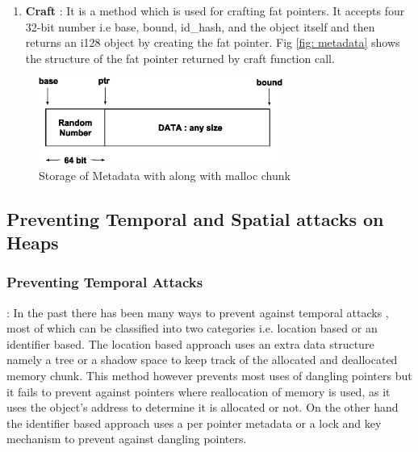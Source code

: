 \begin{enumerate}
    \item \textbf{Craft} : It is a method which is used for crafting fat pointers. It accepts four 32-bit number i.e base, bound, id\_hash, and the object itself and then returns an i128 object by creating the fat pointer. Fig \ref{fig: metadata} shows the structure of the fat pointer returned by craft function call.
\end{enumerate}

\begin{figure}
\centering
\captionsetup{justification=centering}
\includegraphics[width=8cm]{malloc.eps}
\caption{Storage of Metadata with along with malloc chunk}
\label{fig:malloc_chuck}
\hrulefill
\end{figure}

\subsection{Preventing Temporal and Spatial attacks on Heaps}

\subsubsection{Preventing Temporal Attacks} :\label{temp_heap}
In the past there has been many ways to prevent against temporal attacks \cite{Austin,DieHard,Dhurjati,Dhurjati1,Purify,Valgrind,Exterminator,Fischer,MemTracker,BackCompTrans,CETS}, most of which can be classified into two categories i.e. location based or an identifier based. The location based\cite{Purify,BackBoundsChecking,Valgrind,MemTracker} approach uses an extra data structure namely a tree or a shadow space to keep track of the allocated and deallocated memory chunk. This method however prevents most uses of dangling pointers but it fails to prevent against pointers where reallocation of memory is used, as it uses the object's address to determine it is allocated or not. On the other hand the identifier based\cite{CETS,Fischer,BackCompTrans} approach uses a per pointer metadata or a lock and key mechanism to prevent against dangling pointers.

